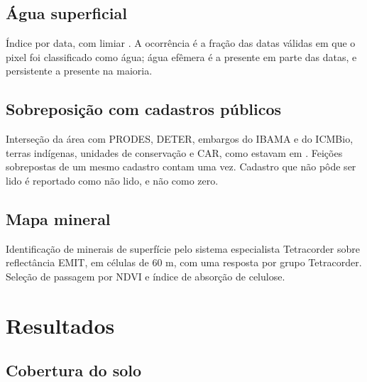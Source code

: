 \documentclass[11pt,a4paper]{article}
\begin{document}
\subsection{Água superficial}
Índice  \citep{xu2006} por data, com limiar
 \citep{otsu1979}. A ocorrência é a fração das datas
válidas em que o pixel foi classificado como água; água efêmera é a presente
em parte das datas, e persistente a presente na maioria.

\subsection{Sobreposição com cadastros públicos}
Interseção da área com PRODES, DETER, embargos do IBAMA e do ICMBio, terras
indígenas, unidades de conservação e CAR, como estavam em
. Feições sobrepostas de um mesmo cadastro contam uma vez.
Cadastro que não pôde ser lido é reportado como não lido, e não como zero.

\subsection{Mapa mineral}
Identificação de minerais de superfície pelo sistema especialista Tetracorder
\citep{clark2003} sobre reflectância EMIT, em células de 60 m, com uma resposta
por grupo Tetracorder. Seleção de passagem por NDVI e índice de absorção de
celulose.

\section{Resultados}

\subsection{Cobertura do solo}

\begin{figure}[htbp]\centering
  \label{fig:classes}
\end{figure}
\end{document}
